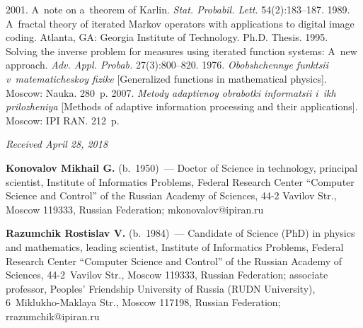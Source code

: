 \begin{multicols}{2}
{{\begin{thebibliography}{99}
   2001. A~note on a~theorem of Karlin. \textit{Stat. 
Probabil. Lett.} 54(2):183--187.
   1989. A~fractal theory of iterated Markov operators with applications to 
digital image coding. Atlanta, GA:  Georgia Institute of Technology. Ph.D. Thesis.
   1995. Solving the inverse problem for measures using 
iterated function systems: A~new approach. \textit{Adv. Appl.
Probab.} 27(3):800--820.
   1976. \textit{Obobshchennye funktsii v~ma\-te\-ma\-ti\-che\-skoy fizike} 
[Generalized functions in mathematical physics]. Moscow: Nauka. 280~p.
   2007. \textit{Metody adaptivnoy obrabotki informatsii i~ikh 
prilozheniya} [Methods of adaptive information processing and their applications]. Moscow: IPI 
RAN. 212~p.
  \end{thebibliography}

 }
 }

\end{multicols}

\vspace*{-6pt}

\hfill{\small\textit{Received April 28, 2018}}



\Contr

\noindent
\textbf{Konovalov Mikhail G.} (b.\ 1950)~--- Doctor of Science in technology, 
principal scientist, Institute of Informatics Problems, Federal Research 
Center ``Computer Science and Control'' of the Russian Academy of Sciences, 
44-2 Vavilov Str., Moscow 119333, Russian Federation; 
\mbox{mkonovalov@ipiran.ru}

\vspace*{3pt}

\noindent
\textbf{Razumchik Rostislav V.} (b.\ 1984)~--- Candidate of Science (PhD) in 
physics and mathematics, leading scientist, Institute of Informatics 
Problems, Federal Research Center ``Computer Science and Control'' of the 
Russian Academy of Sciences, 44-2~Vavilov Str., Moscow 119333, Russian 
Federation; associate professor, Peoples' Friendship University of Russia 
(RUDN University), 6~Miklukho-Maklaya Str., Moscow 117198, Russian 
Federation; \mbox{rrazumchik@ipiran.ru}

\label{end\stat}

\renewcommand{\bibname}{\protect\rm Литература}       